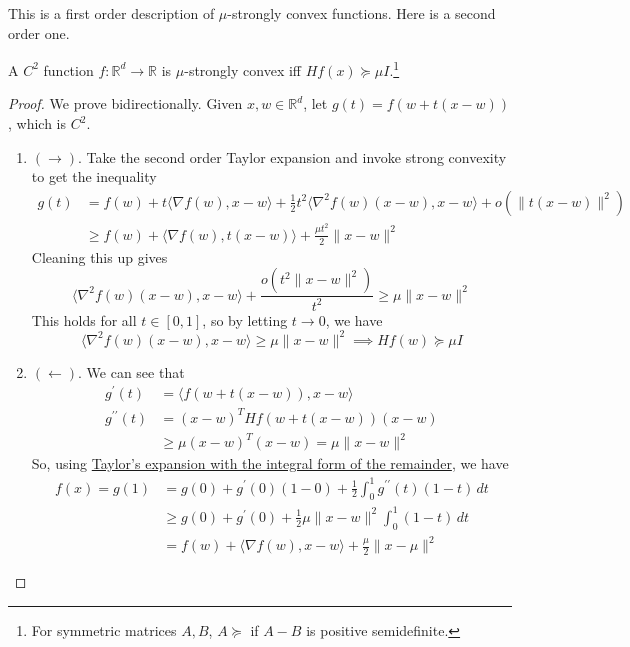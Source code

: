	This is a first order description of $\mu$-strongly convex functions. Here is a second order one. 

	\begin{lemma}
	  A $C^2$ function $f: \mathbb{R}^d \to \mathbb{R}$ is $\mu$-strongly convex iff $Hf(x) \succeq \mu I$.\footnote{For symmetric matrices $A, B$, $A \succeq$ if $A - B$ is positive semidefinite.}
	\end{lemma}
	\begin{proof}
		We prove bidirectionally. Given $x, w \in \mathbb{R}^d$, let $g(t) = f(w + t(x - w))$, which is $C^2$. 
		\begin{enumerate}
		  \item $(\rightarrow)$. Take the second order Taylor expansion and invoke strong convexity to get the inequality 
				\begin{align}
					g(t) & = f(w) + t \langle \nabla f(w), x - w \rangle + \frac{1}{2} t^2 \langle \nabla^2 f(w) (x - w), x - w \rangle + o(\|t(x - w)\|^2) \\ 
							 & \geq f(w) + \langle \nabla f(w), t (x - w) \rangle + \frac{\mu t^2}{2} \|x - w\|^2
				\end{align}
				Cleaning this up gives 
				\begin{equation}
					\langle \nabla^2 f(w) (x - w), x - w \rangle + \frac{o(t^2 \|x - w\|^2)}{t^2} \geq \mu \|x - w\|^2
				\end{equation}
				This holds for all $t \in [0, 1]$, so by letting $t \to 0$, we have 
				\begin{equation}
				  \langle \nabla^2 f(w) (x - w), x - w \rangle \geq \mu \|x - w\|^2 \implies Hf(w) \succeq \mu I
				\end{equation}

		  \item $(\leftarrow)$. We can see that 
				\begin{align}
					g^\prime (t) & = \langle f(w + t(x - w)), x - w \rangle \\ 
					g^{\prime\prime} (t) & = (x - w)^T H f(w + t(x - w)) (x - w) \\ 
															 & \geq \mu (x - w)^T (x - w) = \mu \|x - w\|^2
				\end{align}
				So, using \hyperref[real-thm:integral_form_remainder]{Taylor's expansion with the integral form of the remainder}, we have 
				\begin{align}
					f(x) = g(1) & = g(0) + g^\prime (0) (1 - 0) + \frac{1}{2} \int_0^1 g^{\prime\prime} (t) (1 - t) \,dt \\ 
											& \geq g(0) + g^\prime (0) + \frac{1}{2} \mu \|x - w\|^2 \int_0^1 (1 - t) \,dt \\ 
											& = f(w) + \langle \nabla f(w), x - w \rangle + \frac{\mu}{2} \|x - \mu\|^2
				\end{align}
		\end{enumerate}
	\end{proof}

